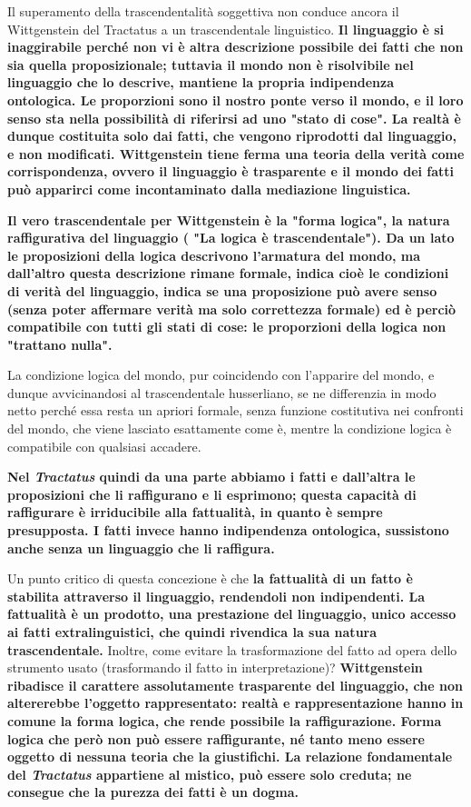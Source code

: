 Il superamento della trascendentalità
soggettiva non conduce ancora il Wittgenstein
del Tractatus a un trascendentale linguistico.
\textbf{Il linguaggio è si inaggirabile perché non vi
è altra descrizione possibile dei fatti che
non sia quella proposizionale; tuttavia il
mondo non è risolvibile nel linguaggio che
lo descrive, mantiene la propria indipendenza
ontologica. Le proporzioni sono il nostro
ponte verso il mondo, e il loro senso
sta nella possibilità di riferirsi ad uno
"stato di cose". La realtà è dunque
costituita solo dai fatti, che vengono riprodotti
dal linguaggio, e non modificati.
Wittgenstein tiene ferma una teoria della
verità come corrispondenza, ovvero il
linguaggio è trasparente e il mondo dei
fatti può apparirci come incontaminato
dalla mediazione linguistica.}

\textbf{Il vero trascendentale per Wittgenstein è
la "forma logica", la natura raffigurativa
del linguaggio ( "La logica è trascendentale").
Da un lato le proposizioni della logica
descrivono l'armatura del mondo, ma dall'altro questa descrizione rimane formale,
indica cioè le condizioni di verità del
linguaggio, indica se una proposizione può avere senso (senza poter affermare verità ma solo correttezza formale) ed è perciò compatibile con
tutti gli stati di cose: le proporzioni
della logica non "trattano nulla".}

La condizione logica del mondo, pur
coincidendo con l'apparire del mondo, e dunque avvicinandosi al trascendentale
husserliano, se ne differenzia in modo
netto perché essa resta un apriori formale,
senza funzione costitutiva nei confronti
del mondo, che viene lasciato esattamente
come è, mentre la condizione logica è
compatibile con qualsiasi accadere.

\textbf{Nel \textit{Tractatus} quindi da una parte abbiamo i fatti e dall'altra le proposizioni che li raffigurano e li esprimono; questa capacità di raffigurare è irriducibile alla fattualità, in quanto è sempre presupposta. I fatti invece hanno indipendenza ontologica, sussistono anche senza un linguaggio che li raffigura.}

Un punto critico di questa concezione è che \textbf{la fattualità di un fatto è stabilita attraverso il linguaggio, rendendoli non indipendenti. La fattualità è un prodotto, una prestazione del linguaggio, unico accesso ai fatti extralinguistici, che quindi rivendica la sua natura trascendentale. }
Inoltre, come evitare la trasformazione del fatto ad opera dello strumento usato (trasformando il fatto in interpretazione)?
\textbf{Wittgenstein ribadisce il carattere assolutamente trasparente del linguaggio, che non altererebbe l'oggetto rappresentato: realtà e rappresentazione hanno in comune la forma logica, che rende possibile la raffigurazione. Forma logica che però non può essere raffigurante, né tanto meno essere oggetto di nessuna teoria che la giustifichi. La relazione fondamentale del \textit{Tractatus} appartiene al mistico, può essere solo creduta; ne consegue che la purezza dei fatti è un dogma.}

